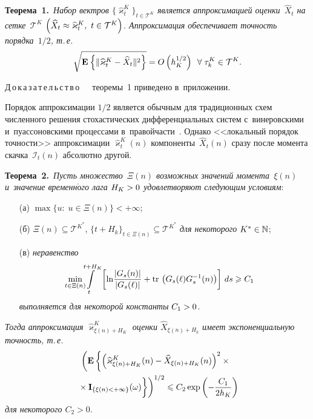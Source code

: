 \begin{multicols}{2}
\vspace*{-2pt}

\noindent
\textbf{Теорема~1.}\
\textit{Набор вектров $\{\widehat{\varkappa}^K_t\}_{t \in \mathcal{T}^K}$ 
является аппроксимацией оценки~$\widehat{X}_t$ на сетке~$\mathcal{T}^K$ 
$\left(\widehat{X}_{t}\hm \approx \widehat{\varkappa}^K_{t},\ t \hm\in \mathcal{T}^K\right)$. 
Аппроксимация обеспечивает точность порядка~${1}/{2}$, т.\,е.}
  \begin{equation}
  \sqrt{\mathbf{E}_{  }\left\{ \mathop{\|\widehat{\varkappa}^K_{t}-\widehat{X}_{t}\|^2} \right\}} = O\left(h_K^{1/2}\right) \enskip 
  \forall \; \tau_k^K \in \mathcal{T}^K.
  \label{eq:approx_ord}
  \end{equation}

\noindent
Д\,о\,к\,а\,з\,а\,т\,е\,л\,ь\,с\,т\,в\,о\ \  \ теоремы~1 приведено в~при\-ложении.

\smallskip

Порядок аппроксимации ${1}/{2}$ является обычным для традиционных схем 
численного решения стохастических дифференциальных систем с~винеровскими 
и~пуассоновскими процессами в~правой\linebreak части~\cite{PB_10}.
Однако <<локальный порядок точности>> аппроксимации $\widehat{\varkappa}_t^K(n)$ 
компоненты~$\widehat{X}_t(n)$ сразу после момента скачка~$\mathcal{I}_t(n)$ 
абсолютно другой.

\smallskip

\noindent
\textbf{Теорема~2.}\ \textit{Пусть множество~$\Xi(n)$ возможных значений 
момента~$\xi(n)$ и~значение временн$\acute{\mbox{о}}$го лага $H_K \hm> 0$ удовлетворяют следующим 
условиям}:
\begin{itemize}
\item[(а)]
$\max\{u:\; u \in \Xi(n)\} < + \infty$;
\item[(б)]
$\Xi(n) \subseteq \mathcal{T}^{K^*}$, $\{t+H_k\}_{t \in \Xi(n)}\subseteq 
\mathcal{T}^{K^*}$ \textit{для некоторого} $K^* \hm\in \mathbb{N}$;
\item[(в)]
\textit{неравенство}
\begin{equation*}
\!\!\!\!\!\!\!\min\limits_{t \in \Xi(n)}\!\!\!\!\int\limits_{t}^{t+H_K}\left[
\ln\!\fr{|G_s(n)|}{|G_s(\ell)|}
+
\mathrm{tr}\,
\left(
G_s(\ell)
G_s^{-1}(n)
\right)
\right]\,ds \geqslant C_1
\end{equation*}
\textit{выполняется для некоторой константы} $C_1\hm>0$.
\end{itemize}
\textit{Тогда аппроксимация $\widehat{\varkappa}^K_{\xi(n) + H_K}$ 
оценки $\widehat{X}_{\xi(n)+H_k}$ имеет экспоненциальную точность, т.\,е.}
  \begin{multline*}
 \left( \mathbf{E}\left\{\left(\widehat{\varkappa}^K_{\xi(n) + H_K}(n)-\widehat{X}_{\xi(n) + 
  H_K}(n)\right)^2\times{}\right.\right.\\
\left.\left.{}\times  \mathbf{I}_{\{\xi(n)< + \infty\}}(\omega)
\vphantom{\left(\widehat{\varkappa}^K_{\xi(n) + H_K}(n)-\widehat{X}_{\xi(n) + 
  H_K}(n)\right)^2}
  \right\}
\right)^{1/2} 
  \leqslant C_2 \exp\left(-{\fr{C_1}{2h_K}} \right)
  \label{eq:approx_ord_2}
  \end{multline*}
 \textit{для некоторого $C_2>0$.}
 

\end{multicols}
